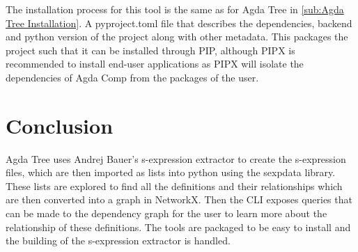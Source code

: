 The installation process for this tool is the same as for Agda Tree in 
\cref{sub:Agda Tree Installation}. A pyproject.toml file that describes
the dependencies, backend and python version of the project along with
other metadata. This packages the project such that it can be installed through
PIP, although PIPX is recommended to install end-user applications as PIPX will
isolate the dependencies of Agda Comp from the packages of the user.


\section{Conclusion}

Agda Tree uses Andrej Bauer's s-expression extractor to create the s-expression
files, which are then imported as lists into python using the sexpdata library.
These lists are explored to find all the definitions and their relationships
which are then converted into a graph in NetworkX.  Then the CLI exposes
queries that can be made to the dependency graph for the user to learn more
about the relationship of these definitions. The tools are packaged to be easy
to install and the building of the s-expression extractor is handled.

